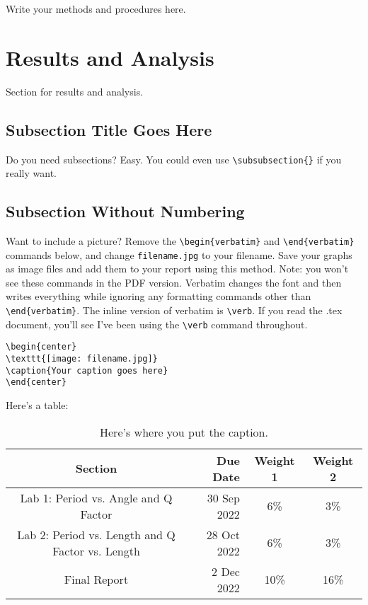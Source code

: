 \documentclass[12pt]{article}
\begin{document}
Write your methods and procedures here.

\section{Results and Analysis}

Section for results and analysis.

\subsection{Subsection Title Goes Here}

Do you need subsections? Easy. You could even use \verb!\subsubsection{}! if you really want.

\subsection*{Subsection Without Numbering}

Want to include a picture? Remove the \verb!\begin{verbatim}! and \verb!\end{verbatim}! commands below, and change \verb!filename.jpg! to your filename. Save your graphs as image files and add them to your report using this method. Note: you won't see these commands in the PDF version. Verbatim changes the font and then writes everything while ignoring any formatting commands other than \verb!\end{verbatim}!. The inline version of verbatim is \verb!\verb!. If you read the .tex document, you'll see I've been using the \verb!\verb! command throughout.
\begin{verbatim}
\begin{center}
\texttt{[image: filename.jpg]}
\caption{Your caption goes here}
\end{center}
\end{verbatim}

Here's a table:
\begin{table}[h!]
\begin{center}
	\begin{tabular}{| c | r | c | c |}
		\hline
		Section                    & Due Date    & Weight 1 & Weight 2\\ \hline
		Lab 1: Period vs. Angle and Q Factor  & 30 Sep 2022 & 6\%  & 3\%  \\
		Lab 2: Period vs. Length and Q Factor vs. Length & 28 Oct 2022 & 6\%  & 3\%  \\
		Final Report & 2 Dec 2022 & 10\% & 16\% \\ \hline
	\end{tabular}
\caption{\label{TableName} Here's where you put the caption.}
\end{center}
\end{table}
\end{document}
